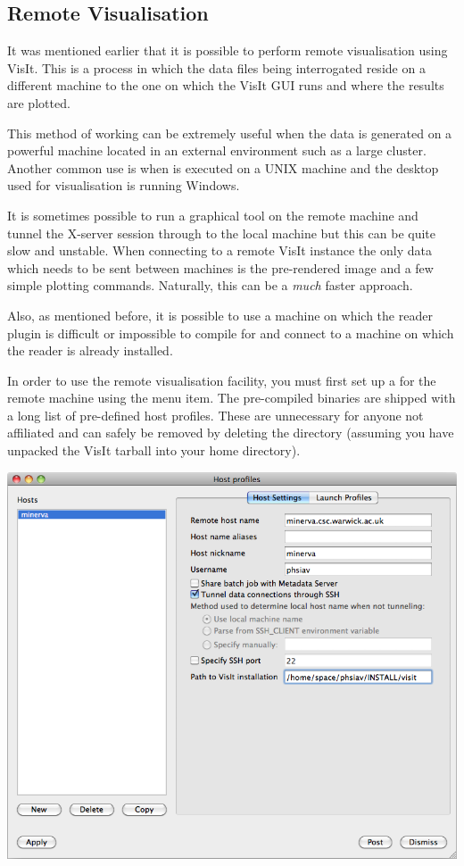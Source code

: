 \subsection{Remote Visualisation}
  It was mentioned earlier that it is possible to perform remote visualisation
  using VisIt. This is a process in which the data files being interrogated
  reside on a different machine to the one on which the VisIt GUI runs and
  where the results are plotted.

  This method of working can be extremely useful when the data is generated
  on a powerful machine located in an external environment such as a large
  cluster. Another common use is when {\EPOCH} is executed on a UNIX machine
  and the desktop used for visualisation is running Windows.

  It is sometimes possible to run a graphical tool on the remote machine
  and tunnel the X-server session through to the local machine but this
  can be quite slow and unstable. When connecting to a remote VisIt
  instance the only data which needs to be sent between machines is the
  pre-rendered image and a few simple plotting commands. Naturally, this
  can be a {\em much} faster approach.

  Also, as mentioned before, it is possible to use a machine on which the
  reader plugin is difficult or impossible to compile for and connect
  to a machine on which the reader is already installed.

  In order to use the remote visualisation facility, you must first
  set up a  for the remote machine using the  menu item. The pre-compiled binaries are
  shipped with a long list of pre-defined host profiles. These are unnecessary
  for anyone not affiliated and can safely be removed by deleting the
  directory  (assuming you have unpacked
  the VisIt tarball into your home directory).

  \begin{center}
    \includegraphics[width=0.8\linewidth]{images/visit_host_profile}
  \end{center}

